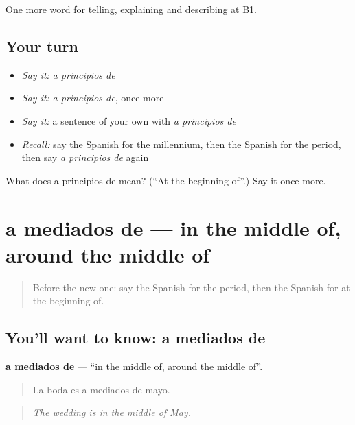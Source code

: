 \begin{grammarlens}[title={What you've built}]
One more word for telling, explaining and describing at B1.
\end{grammarlens}

\subsection*{Your turn}
\begin{itemize}
\raggedright
  \item \emph{Say it:} \emph{a principios de}
  \item \emph{Say it:} \emph{a principios de}, once more
  \item \emph{Say it:} a sentence of your own with \emph{a principios de}
  \item \emph{Recall:} say the Spanish for the millennium, then the Spanish for the period, then say \emph{a principios de} again
\end{itemize}

\begin{tcolorbox}[breakable,colback=teal!4,colframe=teal!35!black,title={Before you move on}]
What does a principios de mean? (\textquotedblleft{}At the beginning of\textquotedblright{}.) Say it once more.
\end{tcolorbox}
\section[a mediados de]{a mediados de — in the middle of, around the middle of}

\label{lesson:ES-C540-a-mediados-de}



\begin{quote}
Before the new one: say the Spanish for the period, then the Spanish for at the beginning of.
\end{quote}

\subsection*{You'll want to know: a mediados de}
\textbf{a mediados de} — \textquotedblleft{}in the middle of, around the middle of\textquotedblright{}.

\begin{quote}
La boda es a mediados de mayo.
\end{quote}

\begin{quote}
\emph{The wedding is in the middle of May.}
\end{quote}

